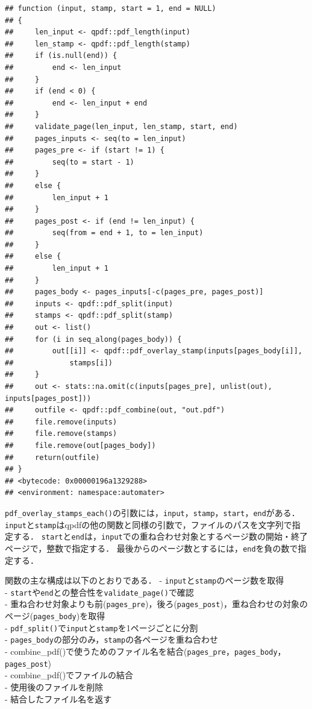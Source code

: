 \documentclass[
]{article}
\begin{document}
\begin{verbatim}
## function (input, stamp, start = 1, end = NULL) 
## {
##     len_input <- qpdf::pdf_length(input)
##     len_stamp <- qpdf::pdf_length(stamp)
##     if (is.null(end)) {
##         end <- len_input
##     }
##     if (end < 0) {
##         end <- len_input + end
##     }
##     validate_page(len_input, len_stamp, start, end)
##     pages_inputs <- seq(to = len_input)
##     pages_pre <- if (start != 1) {
##         seq(to = start - 1)
##     }
##     else {
##         len_input + 1
##     }
##     pages_post <- if (end != len_input) {
##         seq(from = end + 1, to = len_input)
##     }
##     else {
##         len_input + 1
##     }
##     pages_body <- pages_inputs[-c(pages_pre, pages_post)]
##     inputs <- qpdf::pdf_split(input)
##     stamps <- qpdf::pdf_split(stamp)
##     out <- list()
##     for (i in seq_along(pages_body)) {
##         out[[i]] <- qpdf::pdf_overlay_stamp(inputs[pages_body[i]], 
##             stamps[i])
##     }
##     out <- stats::na.omit(c(inputs[pages_pre], unlist(out), inputs[pages_post]))
##     outfile <- qpdf::pdf_combine(out, "out.pdf")
##     file.remove(inputs)
##     file.remove(stamps)
##     file.remove(out[pages_body])
##     return(outfile)
## }
## <bytecode: 0x00000196a1329288>
## <environment: namespace:automater>
\end{verbatim}

\texttt{pdf\_overlay\_stamps\_each()}の引数には，\texttt{input}，\texttt{stamp}，\texttt{start}，\texttt{end}がある．
\texttt{input}と\texttt{stamp}はqpdfの他の関数と同様の引数で，ファイルのパスを文字列で指定する．
\texttt{start}と\texttt{end}は，\texttt{input}での重ね合わせ対象とするページ数の開始・終了ページで，整数で指定する．
最後からのページ数とするには，\texttt{end}を負の数で指定する．

関数の主な構成は以下のとおりである．
- \texttt{input}と\texttt{stamp}のページ数を取得\\
- \texttt{start}や\texttt{end}との整合性を\texttt{validate\_page()}で確認\\
- 重ね合わせ対象よりも前(\texttt{pages\_pre})，後ろ(\texttt{pages\_post})，重ね合わせの対象のページ(\texttt{pages\_body})を取得\\
- \texttt{pdf\_split()}で\texttt{input}と\texttt{stamp}を1ページごとに分割\\
- \texttt{pages\_body}の部分のみ，\texttt{stamp}の各ページを重ね合わせ\\
- combine\_pdf()で使うためのファイル名を結合(\texttt{pages\_pre}，\texttt{pages\_body}，\texttt{pages\_post})\\
- combine\_pdf()でファイルの結合\\
- 使用後のファイルを削除\\
- 結合したファイル名を返す
\end{document}

